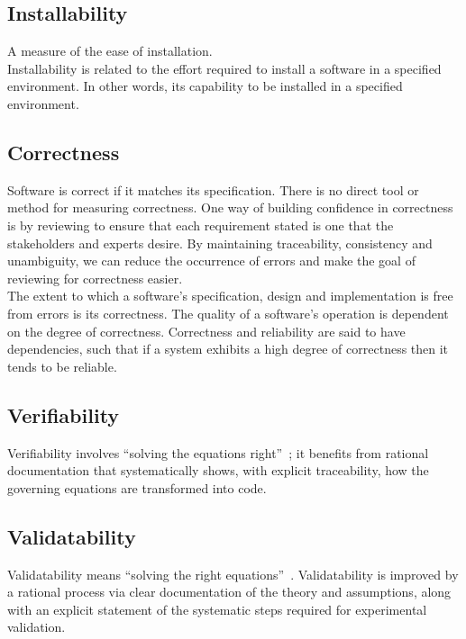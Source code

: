 \documentclass[12pt]{article}
\begin{document}
\subsection{Installability}

A measure of the ease of installation.\\
Installability is related to the effort required to install a software in a specified environment. In other words, its capability to be installed in a specified environment.


\subsection{Correctness}

Software is correct if it matches its specification.  There is no direct tool or
method for measuring correctness. One way of building confidence in correctness
is by reviewing to ensure that each requirement stated is one that the
stakeholders and experts desire.  By maintaining traceability, consistency and
unambiguity, we can reduce the occurrence of errors and make the goal of
reviewing for correctness easier.\\
 The extent to which a software's specification, design and implementation is free from errors is its correctness. The quality of a software's operation is dependent on the degree of correctness. Correctness and reliability are said to have dependencies, such that if a system exhibits a high degree of correctness then it tends to be reliable.

\subsection{Verifiability}

Verifiability involves ``solving the equations right''~\cite[p.~23]{Roache1998};
it benefits from rational documentation that systematically shows, with explicit
traceability, how the governing equations are transformed into code.

\subsection{Validatability}

Validatability means ``solving the right equations''~\cite[p.~23]{Roache1998}.
Validatability is improved by a rational process via clear documentation of the
theory and assumptions, along with an explicit statement of the systematic steps
required for experimental validation.
\end{document}
